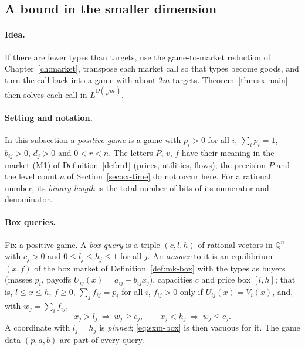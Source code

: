 \subsection{A bound in the smaller dimension}

\paragraph{Idea.} If there are fewer types than targets, use the game-to-market reduction of
Chapter~\ref{ch:market}, transpose each market call so that types become goods, and turn the call back
into a game with about $2m$ targets. Theorem~\ref{thm:sx-main} then solves each call in
$L^{O(\sqrt m)}$.

\providecommand{\Xlo}{\underline{X}}\providecommand{\Xhi}{\overline{X}}
\paragraph{Setting and notation.} In this subsection a \emph{positive game} is a game with $p_i>0$ for
all $i$, $\sum_ip_i=1$, $b_{ij}>0$, $d_j>0$ and $0<r<n$. The letters $P$, $v$, $f$ have their meaning
in the market (M1) of Definition~\ref{def:m1} (prices, utilities, flows); the precision $P$ and the
level count $a$ of Section~\ref{sec:sx-time} do not occur here. For a rational number, its
\emph{binary length} is the total number of bits of its numerator and denominator.

\paragraph{Box queries.} Fix a positive game. A \emph{box query} is a triple $(c,l,h)$ of rational
vectors in $\mathbb Q^n$ with $c_j>0$ and $0\le l_j\le h_j\le1$ for all $j$. An \emph{answer} to it is an
equilibrium $(x,f)$ of the box market of Definition~\ref{def:mk-box} with the types as buyers
(masses $p_i$, payoffs $U_{ij}(x)=a_{ij}-b_{ij}x_j$), capacities $c$ and price box $[l,h]$; that is,
$l\le x\le h$, $f\ge0$, $\sum_jf_{ij}=p_i$ for all $i$, $f_{ij}>0$ only if $U_{ij}(x)=V_i(x)$, and, with
$w_j=\sum_if_{ij}$,
\begin{equation}\label{eq:sxm-box}
x_j>l_j\ \Longrightarrow\ w_j\ge c_j,\qquad x_j<h_j\ \Longrightarrow\ w_j\le c_j .
\end{equation}
A coordinate with $l_j=h_j$ is \emph{pinned}; \eqref{eq:sxm-box} is then vacuous for it. The game data
$(p,a,b)$ are part of every query.

